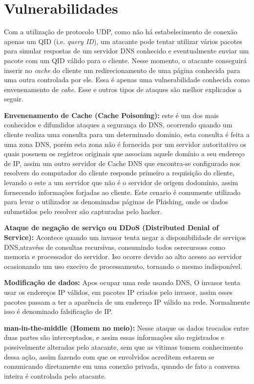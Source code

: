 \documentclass[a4paper]{report} %
\begin{document}
\section{Vulnerabilidades}
\label{sec_vulnerabilidades}

Com a utilização de protocolo UDP, como não há estabelecimento de conexão apenas um QID (i.e. \textit{query ID}), um atacante pode tentar utilizar vários pacotes para simular respostas de um servidor DNS conhecido e eventualmente enviar um pacote com um QID válido para o cliente. Nesse momento, o atacante conseguirá inserir no \textit{cache} do cliente um redirecionamento de uma página conhecida para uma outra controlada por ele. Essa é apenas uma vulnerabilidade conhecida como envenenamento de \textit{cahe}. Esse e outros tipos de ataques são melhor explicados a seguir.

{\bf Envenenamento de Cache (Cache Poisoning): }este é um dos mais conhecidos e difundidos ataques a segurança do DNS, ocorrendo quando um cliente realiza uma consulta para um determinado dominio, esta consulta é feita a uma zona DNS, porém esta zona não é fornecida por um servidor autoritativo os quais possuem os registros originais que associam aquele domínio a seu endereço de IP, assim um outro servidor de Cache DNS que encontra-se configurado nos resolvers do computador do cliente responde primeiro a requisição do cliente, levando o este a um servidor que não é o servidor de origem dodomínio, assim fornecendo informações forjadas ao cliente. Este cenario é comumente utilizado para levar o utilizador as denominadas páginas de Phishing, onde os dados submetidos pelo resolver são capturadas pelo hacker.

{\bf Ataque de negação de serviço ou DDoS (Distributed Denial of Service): }Acontece quando um invasor tenta negar a disponibilidade de serviços DNS,atravéss de consultas recursivas, consumindo todos osrecursoss como memoria e processador do servidor. Iso ocorre devido ao alto acesso ao servidor ocasionando um uso execivo de processamento, tornando o mesmo indisponível.

{\bf Modificação de dados: } Apos ocupar uma rede usando DNS, O invasor tenta usar os endereços IP válidos, em pacotes IP criados pelo invasor, assim esses pacotes passam a ter a aparência de um endereço IP válido na rede. Normalmente isso é denominado falsificação de IP.

{\bf man-in-the-middle (Homem no meio): } Nesse ataque os dados trocados entre duas partes são interceptados, e assim essas informações são registrados e possivelmente alteradas pelo atacante, sem que as vitimas tomem conhecimento dessa ação, assim fazendo com que os envolvidos acreditem estarem se comunicando diretamente em uma conexão privada, quando de fato a conversa inteira é controlada pelo atacante.
\end{document}
